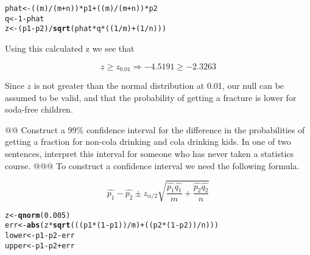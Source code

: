 \documentclass[10pt]{article}\usepackage[]{graphicx}\usepackage[]{xcolor}
\makeatletter
\newcommand{\hlnum}[1]{\textcolor[rgb]{0.686,0.059,0.569}{#1} }%
\newcommand{\hlopt}[1]{\textcolor[rgb]{0,0,0}{#1} }%
\newcommand{\hlstd}[1]{\textcolor[rgb]{0.345,0.345,0.345}{#1} }%
\newcommand{\hlkwb}[1]{\textcolor[rgb]{0.69,0.353,0.396}{#1} }%
\newcommand{\hlkwd}[1]{\textcolor[rgb]{0.737,0.353,0.396}{\textbf{#1} } }%
\newenvironment{kframe}{%
 \def\at@end@of@kframe{}%
 \ifinner\ifhmode%
  \def\at@end@of@kframe{\end{minipage} }%
  \begin{minipage}{\columnwidth}%
 \fi\fi%
 \def\FrameCommand##1{\hskip\@totalleftmargin \hskip-\fboxsep
 \colorbox{shadecolor}{##1}\hskip-\fboxsep
     \hskip-\linewidth \hskip-\@totalleftmargin \hskip\columnwidth}%
 \MakeFramed {\advance\hsize-\width
   \@totalleftmargin\z@ \linewidth\hsize
   \@setminipage} }%
 {\par\unskip\endMakeFramed%
 \at@end@of@kframe}
\newenvironment{knitrout}{}{} %
\makeatother
\begin{document}
\begin{easylist}[enumerate]
\begin{knitrout}
\color{fgcolor}\begin{kframe}
\begin{alltt}
             \hlstd{phat} \hlkwb{<-} \hlstd{((m)}\hlopt{/}\hlstd{(m} \hlopt{+} \hlstd{n))}\hlopt{*}\hlstd{p1} \hlopt{+} \hlstd{((m)}\hlopt{/}\hlstd{(m} \hlopt{+} \hlstd{n))}\hlopt{*}\hlstd{p2}
             \hlstd{q} \hlkwb{<-} \hlnum{1} \hlopt{-} \hlstd{phat}
             \hlstd{z} \hlkwb{<-} \hlstd{(p1} \hlopt{-} \hlstd{p2)} \hlopt{/} \hlkwd{sqrt}\hlstd{(phat} \hlopt{*} \hlstd{q} \hlopt{*} \hlstd{((}\hlnum{1} \hlopt{/} \hlstd{m)} \hlopt{+} \hlstd{(}\hlnum{1} \hlopt{/} \hlstd{n)))}
\end{alltt}
\end{kframe}
\end{knitrout}


    Using this calculated z we see that

    \[
        z \ge z_{0.01} \Rightarrow -4.5191 \ge -2.3263
    \]

    Since $z$ is not greater than the normal distribution at 0.01, our null can be assumed to be valid, and that the
    probability of getting a fracture is lower for soda-free children.

    @@ Construct a 99\% confidence interval for the difference in the probabilities of getting a fraction for non-cola
    drinking and cola drinking kids. In one of two sentences, interpret this interval for someone who has never taken a
    statistics course.
    @@@ To construct a confidence interval we need the following formula.

    \[
        \hat{p_1} - \hat{p_2} \pm z_{\alpha / 2} \sqrt{\frac{\hat{p_1}\hat{q_1} }{m} + \frac{\hat{p_2}\hat{q_2} }{n} }
    \]

\begin{knitrout}
\color{fgcolor}\begin{kframe}
\begin{alltt}
             \hlstd{z} \hlkwb{<-} \hlkwd{qnorm}\hlstd{(}\hlnum{0.005}\hlstd{)}
             \hlstd{err} \hlkwb{<-} \hlkwd{abs}\hlstd{(z} \hlopt{*} \hlkwd{sqrt}\hlstd{(((p1} \hlopt{*} \hlstd{(}\hlnum{1} \hlopt{-} \hlstd{p1))}\hlopt{/}\hlstd{m)} \hlopt{+} \hlstd{((p2} \hlopt{*} \hlstd{(}\hlnum{1} \hlopt{-} \hlstd{p2))}\hlopt{/}\hlstd{n)))}
             \hlstd{lower} \hlkwb{<-} \hlstd{p1} \hlopt{-} \hlstd{p2} \hlopt{-} \hlstd{err}
             \hlstd{upper} \hlkwb{<-} \hlstd{p1} \hlopt{-} \hlstd{p2} \hlopt{+} \hlstd{err}
\end{alltt}
\end{kframe}
\end{knitrout}



\end{easylist}
\end{document}

